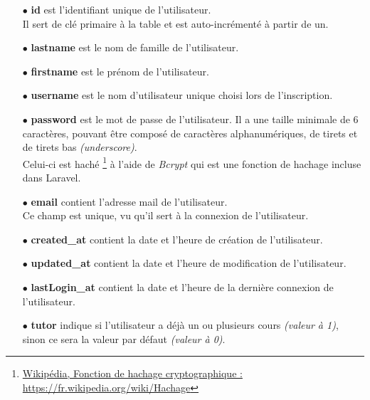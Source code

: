 \begin{itemize}
    
    \item[$\bullet$] \textbf{id} est l'identifiant unique de l'utilisateur.\\
    Il sert de clé primaire à la table et est auto-incrémenté à partir de un.
    
    \item[$\bullet$] \textbf{lastname} est le nom de famille de l'utilisateur.
    
    \item[$\bullet$] \textbf{firstname} est le prénom de l'utilisateur.
    
    \item[$\bullet$] \textbf{username} est le nom d'utilisateur unique choisi lors de l'inscription.
    
    \item[$\bullet$] \textbf{password} est le mot de passe de l'utilisateur. Il a une taille minimale de 6 caractères, pouvant être composé de caractères alphanumériques, de tirets et de tirets bas \textit{(underscore)}.\\
    Celui-ci est haché \footnote{\href{https://fr.wikipedia.org/wiki/Fonction\_de\_hachage\_cryptographique}{Wikipédia, Fonction de hachage cryptographique :  https://fr.wikipedia.org/wiki/Hachage}} à l'aide de \textit{Bcrypt} qui est une fonction de hachage incluse dans Laravel.
    
    \item[$\bullet$] \textbf{email} contient l'adresse mail de l'utilisateur.\\
    Ce champ est unique, vu qu'il sert à la connexion de l'utilisateur.
    
    \item[$\bullet$] \textbf{created\_at} contient la date et l'heure de création de l'utilisateur.
    
    \item[$\bullet$] \textbf{updated\_at} contient la date et l'heure de modification de l'utilisateur.
    
    \item[$\bullet$] \textbf{lastLogin\_at} contient la date et l'heure de la dernière connexion de l'utilisateur.
    
    \item[$\bullet$] \textbf{tutor} indique si l'utilisateur a déjà un ou plusieurs cours \textit{(valeur à 1)}, sinon ce sera la valeur par défaut \textit{(valeur à 0)}.
    

\end{itemize}
